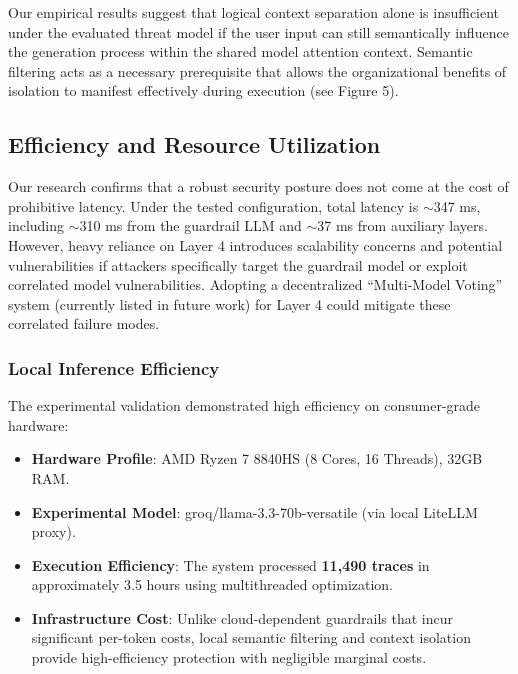 \documentclass[conference]{IEEEtran}
\begin{document}
Our empirical results suggest that logical context separation alone is insufficient under the evaluated threat model if the user input can still semantically influence the generation process within the shared model attention context. Semantic filtering acts as a necessary prerequisite that allows the organizational benefits of isolation to manifest effectively during execution (see Figure 5).

\subsection{Efficiency and Resource Utilization}
Our research confirms that a robust security posture does not come at the cost of prohibitive latency. Under the tested configuration, total latency is $\sim$347 ms, including $\sim$310 ms from the guardrail LLM and $\sim$37 ms from auxiliary layers. However, heavy reliance on Layer 4 introduces scalability concerns and potential vulnerabilities if attackers specifically target the guardrail model or exploit correlated model vulnerabilities. Adopting a decentralized ``Multi-Model Voting'' system (currently listed in future work) for Layer 4 could mitigate these correlated failure modes.
\subsubsection{Local Inference Efficiency}
The experimental validation demonstrated high efficiency on consumer-grade hardware:
\begin{itemize}
    \item \textbf{Hardware Profile}: AMD Ryzen 7 8840HS (8 Cores, 16 Threads), 32GB RAM.
    \item \textbf{Experimental Model}: groq/llama-3.3-70b-versatile (via local LiteLLM proxy).
    \item \textbf{Execution Efficiency}: The system processed \textbf{11,490 traces} in approximately 3.5 hours using multithreaded optimization.
    \item \textbf{Infrastructure Cost}: Unlike cloud-dependent guardrails that incur significant per-token costs, local semantic filtering and context isolation provide high-efficiency protection with negligible marginal costs.
\end{itemize}
\end{document}
